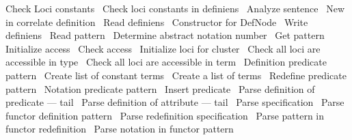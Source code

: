 \nwenddocs{}\plusendmoddef\nwstartdeflinemarkup{}\nwenddeflinemarkup
\LA{}Check Loci constants~{\nwtagstyle{}}\RA{}
\LA{}Check loci constants in definiens~{\nwtagstyle{}}\RA{}
\LA{}Analyze sentence~{\nwtagstyle{}}\RA{}
\LA{}New in correlate definition~{\nwtagstyle{}}\RA{}
\LA{}Read definiens~{\nwtagstyle{}}\RA{}
\LA{}Constructor for \code{}DefNode\edoc{}~{\nwtagstyle{}}\RA{}
\LA{}Write definiens~{\nwtagstyle{}}\RA{}
\LA{}Read pattern~{\nwtagstyle{}}\RA{}
\LA{}Determine abstract notation number~{\nwtagstyle{}}\RA{}
\LA{}Get pattern~{\nwtagstyle{}}\RA{}
\LA{}Initialize access~{\nwtagstyle{}}\RA{}
\LA{}Check access~{\nwtagstyle{}}\RA{}
\LA{}Initialize loci for cluster~{\nwtagstyle{}}\RA{}
\LA{}Check all loci are accessible in type~{\nwtagstyle{}}\RA{}
\LA{}Check all loci are accessible in term~{\nwtagstyle{}}\RA{}
\LA{}Definition predicate pattern~{\nwtagstyle{}}\RA{}
\LA{}Create list of constant terms~{\nwtagstyle{}}\RA{}
\LA{}Create a list of terms~{\nwtagstyle{}}\RA{}
\LA{}Redefine predicate pattern~{\nwtagstyle{}}\RA{}
\LA{}Notation predicate pattern~{\nwtagstyle{}}\RA{}
\LA{}Insert predicate~{\nwtagstyle{}}\RA{}
\LA{}Parse definition of predicate --- tail~{\nwtagstyle{}}\RA{}
\LA{}Parse definition of attribute --- tail~{\nwtagstyle{}}\RA{}
\LA{}Parse specification~{\nwtagstyle{}}\RA{}
\LA{}Parse functor definition pattern~{\nwtagstyle{}}\RA{}
\LA{}Parse redefinition specification~{\nwtagstyle{}}\RA{}
\LA{}Parse pattern in functor redefinition~{\nwtagstyle{}}\RA{}
\LA{}Parse notation in functor pattern~{\nwtagstyle{}}\RA{}
